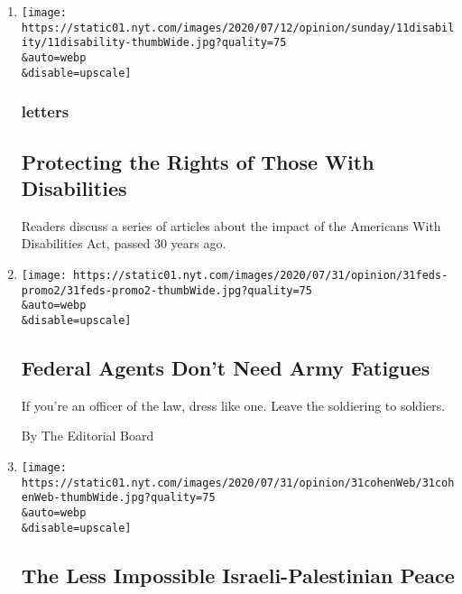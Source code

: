 \begin{enumerate}
\def\labelenumi{\arabic{enumi}.}
\item
  \href{/2020/08/01/opinion/letters/disability-law.html}{}

  \texttt{[image: https://static01.nyt.com/images/2020/07/12/opinion/sunday/11disability/11disability-thumbWide.jpg?quality=75\\\&auto=webp\\\&disable=upscale]}

  \hypertarget{letters}{%
  \subsubsection{letters}\label{letters}}

  \hypertarget{protecting-the-rights-of-those-with-disabilities}{%
  \subsection{Protecting the Rights of Those With
  Disabilities}\label{protecting-the-rights-of-those-with-disabilities}}

  Readers discuss a series of articles about the impact of the Americans
  With Disabilities Act, passed 30 years ago.
\item
  \href{/2020/07/31/opinion/federal-agents-trump-uniforms.html}{}

  \texttt{[image: https://static01.nyt.com/images/2020/07/31/opinion/31feds-promo2/31feds-promo2-thumbWide.jpg?quality=75\\\&auto=webp\\\&disable=upscale]}

  \hypertarget{federal-agents-dont-need-army-fatigues}{%
  \subsection{Federal Agents Don't Need Army
  Fatigues}\label{federal-agents-dont-need-army-fatigues}}

  If you're an officer of the law, dress like one. Leave the soldiering
  to soldiers.

  By The Editorial Board
\item
  \href{/2020/07/31/opinion/israeli-palestinian-peace.html}{}

  \texttt{[image: https://static01.nyt.com/images/2020/07/31/opinion/31cohenWeb/31cohenWeb-thumbWide.jpg?quality=75\\\&auto=webp\\\&disable=upscale]}

  \hypertarget{the-less-impossible-israeli-palestinian-peace}{%
  \subsection{The Less Impossible Israeli-Palestinian
  Peace}\label{the-less-impossible-israeli-palestinian-peace}}


\end{enumerate}

